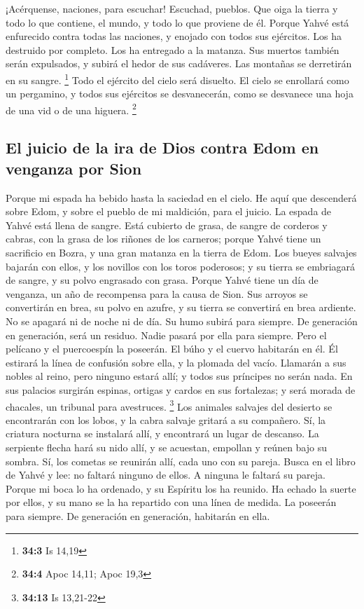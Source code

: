  ¡Acérquense, naciones, para escuchar! Escuchad, pueblos.
Que oiga la tierra y todo lo que contiene, el mundo, y todo lo que
proviene de él.  Porque Yahvé está enfurecido contra todas
las naciones, y enojado con todos sus ejércitos. Los ha destruido por
completo. Los ha entregado a la matanza.  Sus muertos
también serán expulsados, y subirá el hedor de sus cadáveres. Las
montañas se derretirán en su sangre. \footnote{\textbf{34:3} Is 14,19}
 Todo el ejército del cielo será disuelto. El cielo se
enrollará como un pergamino, y todos sus ejércitos se desvanecerán, como
se desvanece una hoja de una vid o de una higuera. \footnote{\textbf{34:4}
  Apoc 14,11; Apoc 19,3}

\hypertarget{el-juicio-de-la-ira-de-dios-contra-edom-en-venganza-por-sion}{%
\subsection{El juicio de la ira de Dios contra Edom en venganza por
Sion}\label{el-juicio-de-la-ira-de-dios-contra-edom-en-venganza-por-sion}}

 Porque mi espada ha bebido hasta la saciedad en el cielo.
He aquí que descenderá sobre Edom, y sobre el pueblo de mi maldición,
para el juicio.  La espada de Yahvé está llena de sangre.
Está cubierto de grasa, de sangre de corderos y cabras, con la grasa de
los riñones de los carneros; porque Yahvé tiene un sacrificio en Bozra,
y una gran matanza en la tierra de Edom.  Los bueyes
salvajes bajarán con ellos, y los novillos con los toros poderosos; y su
tierra se embriagará de sangre, y su polvo engrasado con grasa.
 Porque Yahvé tiene un día de venganza, un año de
recompensa para la causa de Sion.  Sus arroyos se
convertirán en brea, su polvo en azufre, y su tierra se convertirá en
brea ardiente.  No se apagará ni de noche ni de día. Su
humo subirá para siempre. De generación en generación, será un residuo.
Nadie pasará por ella para siempre.  Pero el pelícano y
el puercoespín la poseerán. El búho y el cuervo habitarán en él. Él
estirará la línea de confusión sobre ella, y la plomada del vacío.
 Llamarán a sus nobles al reino, pero ninguno estará
allí; y todos sus príncipes no serán nada.  En sus
palacios surgirán espinas, ortigas y cardos en sus fortalezas; y será
morada de chacales, un tribunal para avestruces. \footnote{\textbf{34:13}
  Is 13,21-22}  Los animales salvajes del desierto se
encontrarán con los lobos, y la cabra salvaje gritará a su compañero.
Sí, la criatura nocturna se instalará allí, y encontrará un lugar de
descanso.  La serpiente flecha hará su nido allí, y se
acuestan, empollan y reúnen bajo su sombra. Sí, los cometas se reunirán
allí, cada uno con su pareja.  Busca en el libro de Yahvé
y lee: no faltará ninguno de ellos. A ninguna le faltará su pareja.
Porque mi boca lo ha ordenado, y su Espíritu los ha reunido.
 Ha echado la suerte por ellos, y su mano se la ha
repartido con una línea de medida. La poseerán para siempre. De
generación en generación, habitarán en ella.

